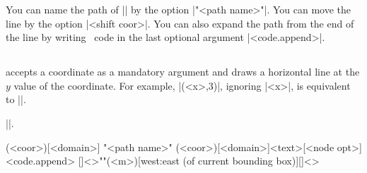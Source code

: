 \begin{tzcode}{.3}
{}
\end{tzcode}

You can name the path of |\tzhfnat| by the option |"<path name>"|.
You can move the line by the option |<shift coor>|.
You can also expand the path from the end of the line by writing \Tikz\ code in the last optional argument |<code.append>|.

\begin{tzcode}{.3}
\end{tzcode}



\subsection{\protect\cmd{\tzhfn}}
\label{ss:tzhfn}

\icmd{\tzhfn} accepts a coordinate as a mandatory argument and draws a horizontal line at the $y$ value of the coordinate.
For example, |\tzhfn(<x>,3)|, ignoring |<x>|, is equivalent to ||.

 |\tzhfnat|.

\begin{tzdef}{}
\tzhfn(<coor>)[<domain>]
  "<path name>"
        (<coor>)[<domain>]{<text>}[<node opt>]<code.append>
  []<>""(<m>)[west:east (of current bounding box)]{}[]<>
\end{tzdef}

\begin{tzcode}{.3}
\end{tzcode}



